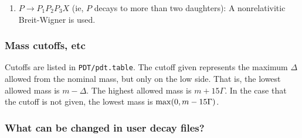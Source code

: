 \begin{enumerate}
\item $P \to P_1 P_2 P_3 X$ (ie, $P$ decays to more than
two daughters): A nonrelativitic Breit-Wigner is
used.

\end{enumerate}




\subsubsection{Mass cutoffs, etc}

Cutoffs are listed in {\tt PDT/pdt.table}.  The cutoff
given represents the maximum $\Delta$ allowed from the 
nominal mass, but only on the low side.  That is, the
lowest allowed mass is $m - \Delta$. The highest allowed
mass is $m + 15 \Gamma$.  In the case that the cutoff
is not given, the lowest mass is ${\rm max}(0, m-15 \Gamma)$.

\subsubsection{What can be changed in user decay files?}

